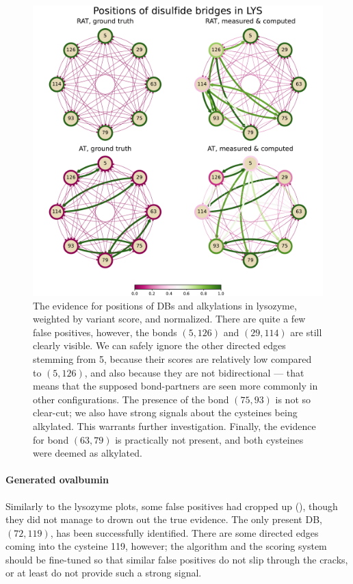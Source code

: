 \begin{figure}
  \centering
  \includegraphics[width=0.8\linewidth]{img/lys.pdf}
  \caption{The evidence for positions of DBs and alkylations in lysozyme, weighted by variant score, and normalized. There are quite a few false positives, however, the bonds \((5, 126)\) and \((29, 114)\) are still clearly visible. We can safely ignore the other directed edges stemming from 5, because their scores are relatively low compared to \((5, 126)\), and also because they are not bidirectional --- that means that the supposed bond-partners are seen more commonly in other configurations. The presence of the bond \((75, 93)\) is not so clear-cut; we also have strong signals about the cysteines being alkylated. This warrants further investigation. Finally, the evidence for bond \((63, 79)\) is practically not present, and both cysteines were deemed as alkylated.}\label{fig:lys}
\end{figure}

\paragraph{Generated ovalbumin} Similarly to the lysozyme plots, some false positives had cropped up (), though they did not manage to drown out the true evidence. The only present DB, \((72, 119)\), has been successfully identified. There are some directed edges coming into the cysteine 119, however; the algorithm and the scoring system should be fine-tuned so that similar false positives do not slip through the cracks, or at least do not provide such a strong signal.

